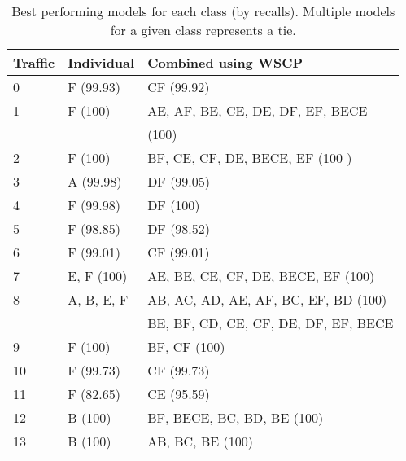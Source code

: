 
\begin{table}[h!]
\caption{Best performing models for each class (by recalls). Multiple models for a given class represents a tie.}
\label{tab:best_performing_models}
\centering
\begin{tabular}{|l|l|l|}
\hline
Traffic & Individual & Combined using WSCP \\
\hline
0 & F (99.93) & CF (99.92) \\ \hline
1 & F (100) & AE, AF, BE, CE, DE, DF, EF, BECE \\ & & (100) \\ \hline
2 & F (100) &BF, CE, CF, DE, BECE, EF (100 )\\ \hline
3 & A (99.98) & DF (99.05) \\\hline
4 & F (99.98) & DF (100) \\ \hline
5 & F (98.85) & DF (98.52) \\ \hline
6 & F (99.01) & CF (99.01) \\ \hline
7 & E, F (100) & AE, BE, CE, CF, DE, BECE, EF (100) \\ \hline
8 & A, B, E, F & AB, AC, AD, AE, AF, BC, EF, BD (100) \\ 
  &   &  BE, BF, CD, CE, CF, DE, DF, EF, BECE  \\ \hline
9 & F (100) & BF, CF (100) \\ \hline
10 & F (99.73) & CF (99.73) \\ \hline
11 & F (82.65) & CE (95.59) \\ \hline
12 & B (100) & BF, BECE, BC, BD, BE (100)\\ \hline
13 & B (100) & AB, BC, BE (100) \\ \hline
\end{tabular}
\end{table}



